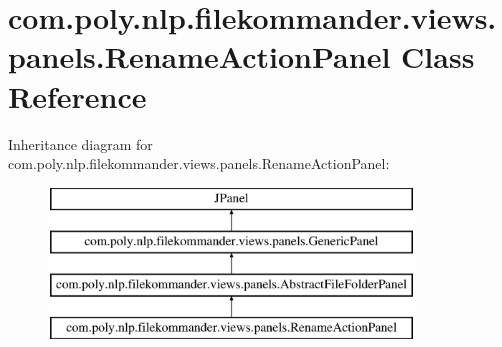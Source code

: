 \hypertarget{classcom_1_1poly_1_1nlp_1_1filekommander_1_1views_1_1panels_1_1_rename_action_panel}{\section{com.\-poly.\-nlp.\-filekommander.\-views.\-panels.\-Rename\-Action\-Panel Class Reference}
\label{classcom_1_1poly_1_1nlp_1_1filekommander_1_1views_1_1panels_1_1_rename_action_panel}
}
Inheritance diagram for com.\-poly.\-nlp.\-filekommander.\-views.\-panels.\-Rename\-Action\-Panel\-:\begin{figure}[H]
\begin{center}
\leavevmode
\includegraphics[height=4.000000cm]{classcom_1_1poly_1_1nlp_1_1filekommander_1_1views_1_1panels_1_1_rename_action_panel}
\end{center}
\end{figure}
